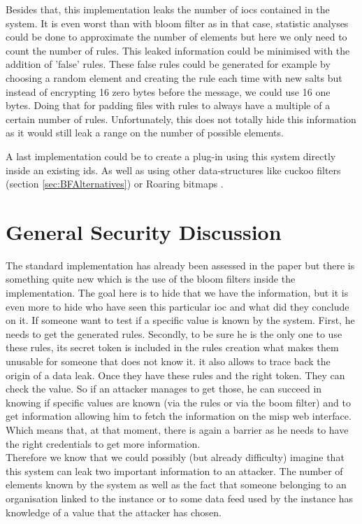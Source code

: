 \documentclass{eplmastersthesis}
\begin{document}
Besides that, this implementation leaks the number of \glspl{ioc} contained in the system. It is even worst than with bloom filter as in that case, statistic analyses could be done to approximate the number of elements but here we only need to count the number of rules. This leaked information could be minimised with the addition of 'false' rules.  These false rules could be generated for example by choosing a random element and creating the rule each time with new salts but instead of encrypting 16 zero bytes before the message, we could use 16 one bytes.
Doing that for padding files with rules to always have a multiple of a certain number of rules. Unfortunately, this does not totally hide this information as it would still leak a range on the number of possible elements.

A last implementation could be to create a plug-in using this system directly inside an existing \gls{ids}. As well as using other data-structures like cuckoo filters (section \ref{sec:BFAlternatives}) or Roaring bitmaps \cite{chambi2015better}.

\section{General Security Discussion}
The standard implementation has already been assessed in the paper  but there is something quite new which is the use of the bloom filters inside the implementation.
The goal here is to hide that we have the information, but it is even more to hide who have seen this particular \gls{ioc} and what did they conclude on it.
If someone want to test if a specific value is known by the system. First, he needs to get the generated rules. Secondly, to be sure he is the only one to use these rules, its secret token is included in the rules creation what makes them unusable for someone that does not know it. it also allows to trace back the origin of a data leak.
Once they have these rules and the right token. They can check the value. So if an attacker manages to get those, he can succeed in knowing if specific values are known (via the rules or via the boom filter) and to get information allowing him to fetch the information on the \gls{misp} web interface. Which means that, at that moment, there is again a barrier as he needs to have the right credentials to get more information.\\

Therefore we know that we could possibly (but already difficulty) imagine that this system can leak two important information to an attacker. The number of elements known by the system as well as the fact that someone belonging to an organisation linked to the instance or to some data feed used by the instance has knowledge of a value that the attacker has chosen.\\
\end{document}
